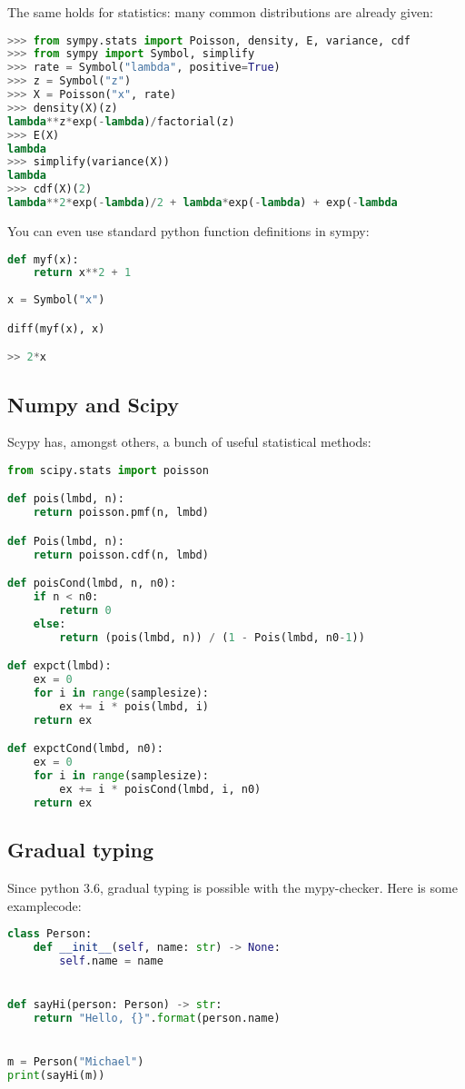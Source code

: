 The same holds for statistics: many common distributions are already given: 

\begin{lstlisting}[language=python]
>>> from sympy.stats import Poisson, density, E, variance, cdf
>>> from sympy import Symbol, simplify
>>> rate = Symbol("lambda", positive=True)
>>> z = Symbol("z")
>>> X = Poisson("x", rate)
>>> density(X)(z)
lambda**z*exp(-lambda)/factorial(z)
>>> E(X)
lambda
>>> simplify(variance(X))
lambda
>>> cdf(X)(2)
lambda**2*exp(-lambda)/2 + lambda*exp(-lambda) + exp(-lambda
\end{lstlisting}


You can even use standard python function  definitions in sympy:

\begin{lstlisting}[language=python]
def myf(x):
    return x**2 + 1
    
x = Symbol("x")

diff(myf(x), x)

>> 2*x
\end{lstlisting}

\subsection{Numpy and Scipy}
Scypy has, amongst others, a bunch of useful statistical methods: 
\begin{lstlisting}[language=python]
from scipy.stats import poisson

def pois(lmbd, n):
    return poisson.pmf(n, lmbd)

def Pois(lmbd, n):
    return poisson.cdf(n, lmbd)

def poisCond(lmbd, n, n0):
    if n < n0:
        return 0
    else:
        return (pois(lmbd, n)) / (1 - Pois(lmbd, n0-1))

def expct(lmbd):
    ex = 0
    for i in range(samplesize):
        ex += i * pois(lmbd, i)
    return ex

def expctCond(lmbd, n0):
    ex = 0
    for i in range(samplesize):
        ex += i * poisCond(lmbd, i, n0)
    return ex
\end{lstlisting}


\subsection{Gradual typing}
Since python 3.6, gradual typing is possible with the mypy-checker. 
Here is some examplecode:
\begin{lstlisting}[language=python]
class Person:
    def __init__(self, name: str) -> None:
        self.name = name


def sayHi(person: Person) -> str:
    return "Hello, {}".format(person.name)


m = Person("Michael")
print(sayHi(m))
\end{lstlisting}

